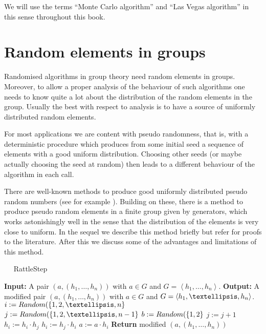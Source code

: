 We will use the terms ``Monte Carlo algorithm'' and ``Las Vegas
algorithm'' in this sense throughout this book.

\section{Random elements in groups}
\label{randomelts}

Randomised algorithms in group theory need random elements in groups.
Moreover, to allow a proper analysis of the behaviour of such
algorithms one needs to know quite a lot about the distribution of
the random elements in the group. Usually the best with respect to
analysis is to have a source of uniformly distributed random elements.

For most applications we are content with pseudo randomness, that is, with a
deterministic procedure which produces from some initial seed a sequence of 
elements with a good uniform distribution. Choosing other seeds (or
maybe actually choosing the seed at random) then leads to a different
behaviour of the algorithm in each call.

There are well-known methods to produce good uniformly distributed
pseudo random numbers (see for example \cite[Chapter~3]{AOCP2}).
Building on these, there is a method to produce pseudo random elements
in a finite group given by generators, which works astonishingly
well in the sense that the distribution of the elements is very close
to uniform. In the sequel we describe this method briefly but refer
for proofs to the literature. After this we discuss some of the
advantages and limitations of this method.

\begin{algorithm}
\caption{$\quad$ \sc RattleStep}
\label{rattlestep}
\begin{algorithmic}
\STATE \textbf{Input:} A pair $(a,(h_1, \ldots, h_n))$ with $a \in G$
and $G = \left< h_1, \ldots, h_n \right>$.
\STATE \textbf{Output:} A modified pair $(a,(h_1, \ldots, h_n))$ with $a \in G$
and $G = \left< \smash{h_1, \ldots, h_n} \right>$.
\vspace*{2mm}
\STATE $i := \textsc{Random}(\{ 1,2,\ldots,n\}$
\STATE $j := \textsc{Random}(\{1,2,\ldots,n-1\}$
\STATE $b := \textsc{Random}(\{1,2\}$
    \STATE $j := j + 1$
\ENDIF
{}
    \STATE $h_i := h_i \cdot h_j$
\ELSE
    \STATE $h_i := h_j \cdot h_i$
\ENDIF
\STATE $a := a \cdot h_i$
\STATE \textbf{Return} modified $(a,(h_1,\ldots,h_n))$
\end{algorithmic}
\end{algorithm}

